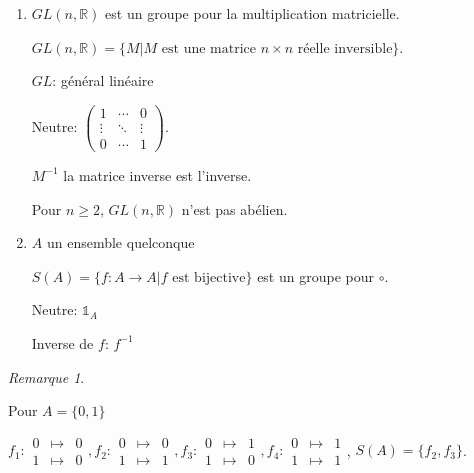 \documentclass{report}
\newcommand*{\reels}{\mathbb{R}}
\theoremstyle{definition}
\theoremstyle{remark}
\newtheorem*{rema}{Remarque}
\begin{document}
	\begin{enumerate}[resume]
		\item $GL(n,\reels)$ est un groupe pour la multiplication matricielle.

		$GL(n,\reels)=\{M|M \text{ est une matrice $n\times n$ r\'eelle inversible}\}$.

		$GL$: g\'en\'eral lin\'eaire

		Neutre: $\left( \begin{array}{ccc}
			1&\dotsb&0\\
			\vdots&\ddots&\vdots\\
			0&\dotsb&1
		\end{array} \right)$.

		$M^{-1}$ la matrice inverse est l'inverse.

		Pour $n \geq 2$, $GL(n,\reels)$  n'est pas ab\'elien.
		\item $A$ un ensemble quelconque

		$S(A)=\{f:A \to A|f \text{ est bijective}\}$ est un groupe pour $\circ$.

		Neutre: $\mathds{1}_A$

		Inverse de $f$: $f^{-1}$
	\end{enumerate}
	\begin{rema}
		~

		Pour $A=\{0,1\}$

		$f_1:\begin{array}{rcl}
			0&\mapsto&0\\
			1&\mapsto&0
		\end{array},f_2:\begin{array}{rcl}
			0&\mapsto&0\\
			1&\mapsto&1
		\end{array},f_3:\begin{array}{rcl}
			0&\mapsto&1\\
			1&\mapsto&0
		\end{array},f_4:\begin{array}{rcl}
			0&\mapsto&1\\
			1&\mapsto&1
		\end{array}$, $S(A)=\{f_2,f_3\}$.
	\end{rema}
\end{document}
